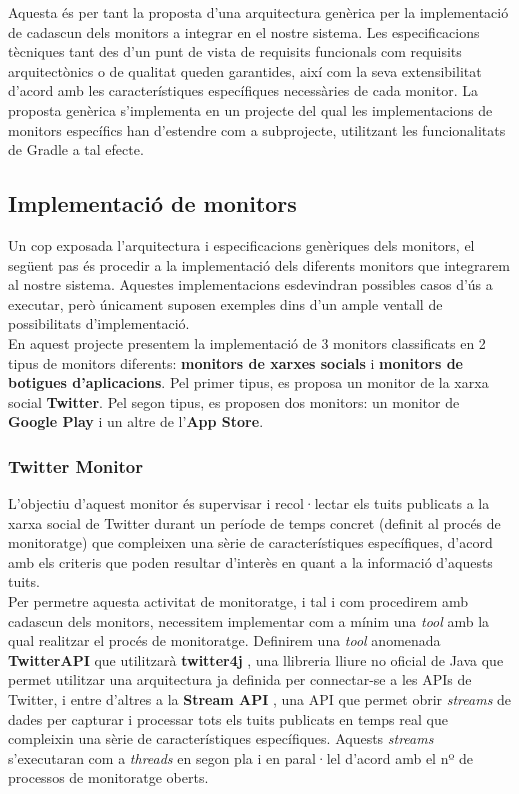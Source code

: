 Aquesta és per tant la proposta d'una arquitectura genèrica per la implementació de cadascun dels monitors a integrar en el nostre sistema. Les especificacions tècniques tant des d'un punt de vista de requisits funcionals com requisits arquitectònics o de qualitat queden garantides, així com la seva extensibilitat d'acord amb les característiques específiques necessàries de cada monitor. La proposta genèrica s'implementa en un projecte del qual les implementacions de monitors específics han d'estendre com a subprojecte, utilitzant les funcionalitats de Gradle a tal efecte.

\subsection{Implementació de monitors}

Un cop exposada l'arquitectura i especificacions genèriques dels monitors, el següent pas és procedir a la implementació dels diferents monitors que integrarem al nostre sistema. Aquestes implementacions esdevindran possibles casos d'ús a executar, però únicament suposen exemples dins d'un ample ventall de possibilitats d'implementació.\\

En aquest projecte presentem la implementació de 3 monitors classificats en 2 tipus de monitors diferents: \textbf{monitors de xarxes socials} i \textbf{monitors de botigues d'aplicacions}. Pel primer tipus, es proposa un monitor de la xarxa social \textbf{Twitter}. Pel segon tipus, es proposen dos monitors: un monitor de \textbf{Google Play} i un altre de l'\textbf{App Store}.

\subsubsection{Twitter Monitor}

L'objectiu d'aquest monitor és supervisar i recol·lectar els tuits publicats a la xarxa social de Twitter durant un període de temps concret (definit al procés de monitoratge) que compleixen una sèrie de característiques específiques, d'acord amb els criteris que poden resultar d'interès en quant a la informació d'aquests tuits. \\

Per permetre aquesta activitat de monitoratge, i tal i com procedirem amb cadascun dels monitors, necessitem implementar com a mínim una \textit{tool} amb la qual realitzar el procés de monitoratge. Definirem una \textit{tool} anomenada \textbf{TwitterAPI} que utilitzarà \textbf{twitter4j} \cite{twitter4j}, una llibreria lliure no oficial de Java que permet utilitzar una arquitectura ja definida per connectar-se a les APIs de Twitter, i entre d'altres a la \textbf{Stream API} \cite{twitter-stream}, una API que permet obrir \textit{streams} de dades per capturar i processar tots els tuits publicats en temps real que compleixin una sèrie de característiques específiques. Aquests \textit{streams} s'executaran com a \textit{threads} en segon pla i en paral·lel d'acord amb el nº de processos de monitoratge oberts.\\

